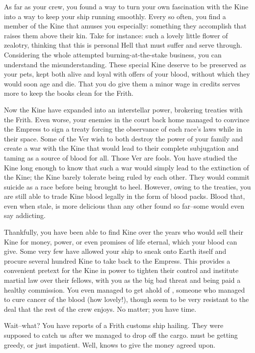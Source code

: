 \documentclass[char]{guildcamp4}
\begin{document}
As far as your crew, you found a way to turn your own fascination with the Kine into a way to keep your ship running smoothly. Every so often, you find a member of the Kine that amuses you especially: something they accomplish that raises them above their kin. Take \cJoan{} for instance: such a lovely little flower of zealotry, thinking that this is \cJoan{\their} personal Hell that \cJoan{\they} must suffer and serve through. Considering the whole attempted burning-at-the-stake business, you can understand the misunderstanding. These special Kine deserve to be preserved as your pets, kept both alive and loyal with offers of your blood, without which they would soon age and die. That you do give them a minor wage in credits serves more to keep the books clean for the Frith.

Now the Kine have expanded into an interstellar power, brokering treaties with the Frith. Even worse, your enemies in the court back home managed to convince the Empress to sign a treaty forcing the observance of each race's laws while in their space. Some of the Ver wish to both destroy the power of your family and create a war with the Kine that would lead to their complete subjugation and taming as a source of blood for all. Those Ver are fools. You have studied the Kine long enough to know that such a war would simply lead to the extinction of the Kine; the Kine barely tolerate being ruled by each other. They would commit suicide as a race before being brought to heel. However, owing to the treaties, you are still able to trade Kine blood legally in the form of blood packs. Blood that, even when stale, is more delicious than any other found so far--some would even say addicting. 

Thankfully, you have been able to find Kine over the years who would sell their Kine for money, power, or even promises of life eternal, which your blood can give. Some very few have allowed your ship to sneak onto Earth itself and procure several hundred Kine to take back to the Empress. This provides a convenient pretext for the Kine in power to tighten their control and institute martial law over their fellows, with you as the big bad threat and being paid a healthy commission. You even managed to get ahold of \cSpite{}, someone who managed to cure cancer of the blood (how lovely!), though \cSpite{\they} seem to be very resistant to the deal that the rest of the crew enjoys. No matter; you have time.

Wait--what? You have reports of a Frith customs ship hailing. They were supposed to catch us after we managed to drop off the cargo. \cCbad{} must be getting greedy, or just impatient. Well, \cVtwo{} knows to give \cCbad{\them} the money agreed upon.
\end{document}
